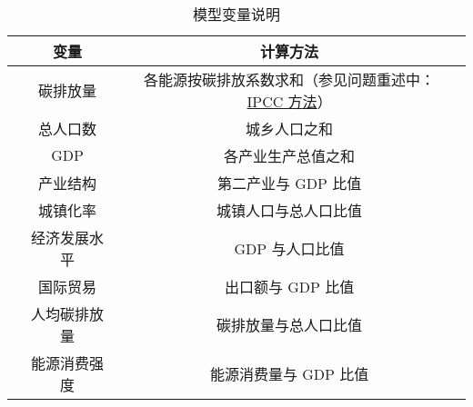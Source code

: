     \begin{table}[htb]
      \caption{模型变量说明}
      \label{tab:bianliangshuoming}
      \centering
      \begin{tabular*}{\textwidth}{@{\extracolsep{\fill}}ccccc}
        \toprule[1.5pt]
        &变量 && 计算方法 &\\
        \midrule[1pt]
        &碳排放量 && 各能源按碳排放系数求和（参见问题重述中：\hyperref[eq:IPCC]{IPCC 方法}） &\\
        &总人口数 && 城乡人口之和 &\\
        &$\mathrm{GDP}$ && 各产业生产总值之和 &\\
        &产业结构 && 第二产业与 $\mathrm{GDP}$ 比值 &\\
        &城镇化率 && 城镇人口与总人口比值 &\\
        &经济发展水平 && $\mathrm{GDP}$ 与人口比值 &\\
        &国际贸易 && 出口额与 $\mathrm{GDP}$ 比值 &\\
        &人均碳排放量 && 碳排放量与总人口比值 &\\
        &能源消费强度 && 能源消费量与 $\mathrm{GDP}$ 比值 &\\
        \bottomrule[1.5pt]
      \end{tabular*}
    \end{table}